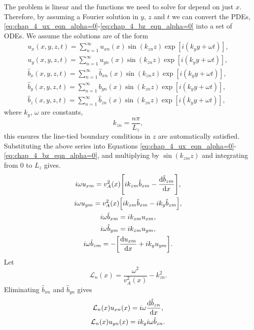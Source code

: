The problem is linear and the functions we need to solve for depend on just $x$. Therefore, by assuming a Fourier solution in $y$, $z$ and $t$ we can convert the PDEs, \eqref{eq:chap_4_ux_eqn_alpha=0}-\eqref{eq:chap_4_bz_eqn_alpha=0} into a set of ODEs.
We assume the solutions are of the form
\begin{gather}
    \label{eq:chap_4_ux_expansion}
    u_x(x,y,z,t) = \sum_{n=1}^\infty u_{xn}(x)\sin(k_{zn}z)\exp[i(k_y y + \omega t)], \\
    u_y(x,y,z,t) = \sum_{n=1}^\infty u_{yn}(x)\sin(k_{zn}z)\exp[i(k_y y + \omega t)], \\
    \hat{b}_x(x,y,z,t) = \sum_{n=1}^\infty \hat{b}_{xn}(x)\sin(k_{zn}z)\exp[i(k_y y + \omega t)], \\
    \hat{b}_y(x,y,z,t) = \sum_{n=1}^\infty \hat{b}_{yn}(x)\sin(k_{zn}z)\exp[i(k_y y + \omega t)], \\
    \label{eq:chap_4_bz_expansion}
    \hat{b}_z(x,y,z,t) = \sum_{n=1}^\infty \hat{b}_{zn}(x)\sin(k_{zn}z)\exp[i(k_y y + \omega t)],
\end{gather}
where $k_y$, $\omega$ are constants,
\begin{equation}
    k_{zn} = \frac{n\pi}{L_z},
\end{equation}
this ensures the line-tied boundary conditions in $z$ are automatically satisfied. Substituting the above series into Equations \eqref{eq:chap_4_ux_eqn_alpha=0}-\eqref{eq:chap_4_bz_eqn_alpha=0}, and multiplying by $\sin(k_{zm}z)$ and integrating from $0$ to $L_z$ gives.
\begin{gather}
    i\omega u_{xm} = v_A^2(x)\qty[ik_{zm} \hat{b}_{xm} - \dv{\hat{b}_{zm}}{x}],\\
    i\omega u_{ym} = v_A^2(x)\qty[ik_{zm} \hat{b}_{xm} - ik_y \hat{b}_{zm}],\\
    i\omega \hat{b}_{xm} = ik_{zm}u_{xm},\\
    i\omega \hat{b}_{ym} = ik_{zm}u_{ym},\\
    \label{eq:chap_4_bz_eqn2_alpha=0}
    i\omega \hat{b}_{zm} = -\qty[\dv{u_{xm}}{x}+ ik_yu_{ym}].
\end{gather}
Let
\begin{equation}
    \mathcal{L}_n(x) = \frac{\omega^2}{v_A^2(x)} - k_{zn}^2.
\end{equation}
Eliminating $\hat{b}_{xn}$ and $\hat{b}_{yn}$ gives
\begin{gather}
   \mathcal{L}_n(x)u_{xn}(x)=i\omega \dv{\hat{b}_{zn}}{x}, \\
   \label{eq:chap_4_uy_eqn_bz}
   \mathcal{L}_n(x)u_{yn}(x)=ik_y i\omega \hat{b}_{zn}.
\end{gather}
